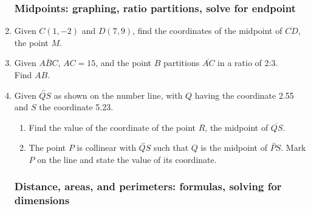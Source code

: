 \documentclass[12pt, oneside]{article}
\begin{document}
\begin{enumerate}
\subsubsection*{Midpoints: graphing, ratio partitions, solve for endpoint}

  \item Given $C(1,-2)$ and $D(7,9)$, find the coordinates of the midpoint of $\overline{CD}$, the point $M$.
    \vspace{4cm}

  \item Given $\overline{ABC}$, $AC=15$, and the point $B$ partitions $\overline{AC}$ in a ratio of 2:3.\\[0.5cm] Find ${AB}$. \\[1.5cm]
       \vspace{3cm}

  \item Given $\overleftrightarrow{QS}$ as shown on the number line, with $Q$ having the coordinate 2.55 and $S$ the coordinate 5.23. \\[10pt] %
     \bigskip
    \begin{enumerate}
      \item Find the value of the coordinate of the point $R$, the midpoint of $\overline{QS}$. \vspace{4cm}
      \item The point $P$ is collinear with $\overleftrightarrow{QS}$ such that $Q$ is the midpoint of $\overleftrightarrow{PS}$. Mark $P$ on the line and state the value of its coordinate.
    \end{enumerate}\vspace{4cm}

\subsubsection*{Distance, areas, and perimeters: formulas, solving for dimensions}


\end{enumerate}
\end{document}
